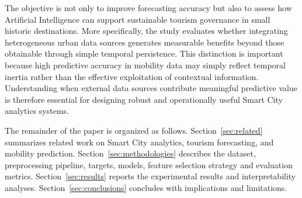 The  objective is not only to improve forecasting accuracy but also to assess how Artificial Intelligence can support sustainable tourism governance in small historic destinations. More specifically, the study evaluates whether integrating heterogeneous urban data sources generates measurable benefits beyond those obtainable through simple temporal persistence.
This distinction is important because high predictive accuracy in mobility data may simply reflect temporal inertia rather than the effective exploitation of contextual information. Understanding when external data sources contribute meaningful predictive value is therefore essential for designing robust and operationally useful Smart City analytics systems.



The remainder of the paper is organized as follows. Section~\ref{sec:related}
summarizes related work on Smart City analytics, tourism forecasting, and mobility prediction.
Section~\ref{sec:methodologies} describes the dataset, preprocessing pipeline, targets,
models, feature selection strategy and evaluation metrics. Section~\ref{sec:results} reports the
experimental results and interpretability analyses. Section~\ref{sec:conclusions}
concludes with implications and limitations.
